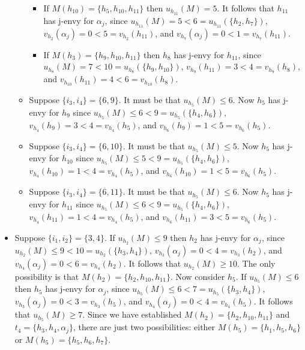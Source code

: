 \begin{itemize}
\begin{itemize}
\begin{itemize}
            \item If $M(h_{10}) = \{ h_5, h_{10}, h_{11} \}$ then $u_{h_{11}}(M) = 5$. It follows that $h_{11}$ has j-envy for $\alpha_{j}$, since $u_{h_{11}}(M) = 5 < 6 = u_{h_{11}}(\{ h_2, h_7 \})$, $v_{h_2}(\alpha_{j}) = 0 < 5 = v_{h_2}(h_{11})$, and $v_{h_7}(\alpha_{j}) = 0 < 1 = v_{h_7}(h_{11})$.
            \item If $M(h_3) = \{ h_9, h_{10}, h_{11} \}$ then $h_8$ has j-envy for $h_{11}$, since $u_{h_8}(M) = 7 < 10 = u_{h_8}(\{ h_9, h_{10} \})$, $v_{h_9}(h_{11}) = 3 < 4 = v_{h_9}(h_8)$, and $v_{h_{10}}(h_{11}) = 4 < 6 = v_{h_{10}}(h_8)$.
        \end{itemize}
        \item Suppose $\{ {i_3}, {i_4} \} = \{ 6, 9 \}$. It must be that $u_{h_5}(M) \leq 6$. Now $h_5$ has j-envy for $h_9$ since $u_{h_5}(M) \leq 6 < 9 = u_{h_5}(\{ h_4, h_6 \})$, $v_{h_4}(h_9) = 3 < 4 = v_{h_4}(h_5)$, and $v_{h_6}(h_9) = 1 < 5 = v_{h_6}(h_5)$.
        \item Suppose $\{ {i_3}, {i_4} \} = \{ 6, 10 \}$. It must be that $u_{h_5}(M) \leq 5$. Now $h_5$ has j-envy for $h_{10}$ since $u_{h_5}(M) \leq 5 < 9 = u_{h_5}(\{ h_4, h_6 \})$, $v_{h_4}(h_{10}) = 1 < 4 = v_{h_4}(h_5)$, and $v_{h_6}(h_{10}) = 1 < 5 = v_{h_6}(h_5)$.
        \item Suppose $\{ {i_3}, {i_4} \} = \{ 6, 11 \}$. It must be that $u_{h_5}(M) \leq 6$. Now $h_5$ has j-envy for $h_{11}$ since $u_{h_5}(M) \leq 6 < 9 = u_{h_5}(\{ h_4, h_6 \})$, $v_{h_4}(h_{11}) = 1 < 4 = v_{h_4}(h_5)$, and $v_{h_6}(h_{11}) = 3 < 5 = v_{h_6}(h_5)$.
    \end{itemize}
\item Suppose $\{ {i_1}, {i_2} \} = \{ 3, 4 \}$. If $u_{h_2}(M) \leq 9$ then $h_2$ has j-envy for $\alpha_{j}$, since $u_{h_2}(M) \leq 9 < 10 = u_{h_2}(\{ h_3, h_4 \})$, $v_{h_3}(\alpha_{j}) = 0 < 4 = v_{h_3}(h_2)$, and $v_{h_4}(\alpha_{j}) = 0 < 6 = v_{h_4}(h_2)$. It follows that $u_{h_2}(M) \geq 10$. The only possibility is that $M(h_2) = \{ h_2, h_{10}, h_{11} \}$. Now consider $h_5$. If $u_{h_5}(M) \leq 6$ then $h_5$ has j-envy for $\alpha_{j}$, since $u_{h_5}(M) \leq 6 < 7 = u_{h_5}(\{ h_3, h_4 \})$, $v_{h_3}(\alpha_{j}) = 0 < 3 = v_{h_3}(h_5)$, and $v_{h_4}(\alpha_{j}) = 0 < 4 = v_{h_4}(h_5)$. It follows that $u_{h_5}(M) \geq 7$. Since we have established $M(h_2) = \{ h_2, h_{10}, h_{11} \}$ and $t_4 = \{ h_3, h_4, \alpha_{j} \}$, there are just two possibilities: either $M(h_5) = \{ h_1, h_5, h_6 \}$ or $M(h_5) = \{ h_5, h_6, h_7 \}$.
\begin{itemize}

\end{itemize}
\end{itemize}
